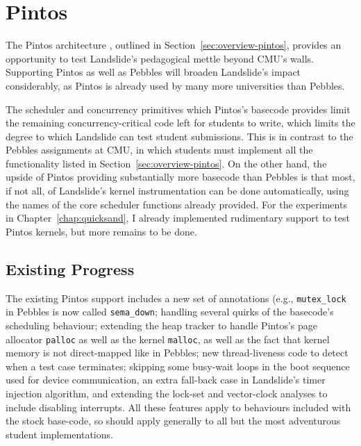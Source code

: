 \chapter{Pintos}
\label{chap:pintos}

The Pintos architecture \cite{pintos}, outlined in Section~\ref{sec:overview-pintos},
provides an opportunity to test Landslide's pedagogical mettle beyond CMU's walls.
Supporting Pintos as well as Pebbles will broaden Landslide's impact considerably,
as Pintos is already used by many more universities than Pebbles.

The scheduler and concurrency primitives which Pintos's basecode provides
limit the remaining concurrency-critical code left for students to write,
which limits the degree to which Landslide can test student submissions.
This is in contrast to the Pebbles assignments at CMU, in which students must implement all the functionality listed in Section~\ref{sec:overview-pintos}.
On the other hand, the upside of Pintos providing substantially more basecode than Pebbles
is that most, if not all, of Landslide's kernel instrumentation can be done automatically,
using the names of the core scheduler functions already provided.
For the experiments in Chapter~\ref{chap:quicksand}, I already implemented rudimentary support to test Pintos kernels, but more remains to be done.

\section{Existing Progress}

The existing Pintos support includes
a new set of annotations (e.g., {\tt mutex\_lock} in Pebbles is now called {\tt sema\_down};
handling several quirks of the basecode's scheduling behaviour; %
extending the heap tracker to handle Pintos's page allocator {\tt palloc} as well as the kernel {\tt malloc},
as well as the fact that kernel memory is not direct-mapped like in Pebbles;
new thread-liveness code to detect when a test case terminates;
skipping some busy-wait loops in the boot sequence used for device communication,
an extra fall-back case in Landslide's timer injection algorithm, %
and extending the lock-set and vector-clock analyses to include disabling interrupts.
All these features apply to behaviours included with the stock base-code, so should apply generally to all but the most adventurous student implementations.

